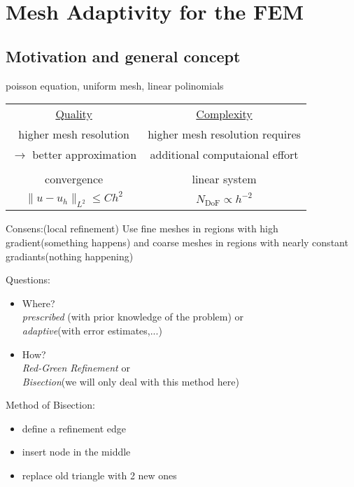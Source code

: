\section{Mesh Adaptivity for the FEM}
\subsection{Motivation and general concept}

\begin{example}
	poisson equation, uniform mesh, linear polinomials
\end{example}
\begin{center}
	\begin{tabular}{c | c}
		\underline{Quality} & \underline{Complexity}\\
		higher mesh resolution & higher mesh resolution requires \\
		$\to$ better approximation & additional computaional effort\\
		&  \\
		convergence & linear system \\
		$\|u-u_h\|_{L^2} \leq C h^2$ & $N_{\text{DoF}}\propto h^{-2}$
	\end{tabular}
\end{center}

Consens:(local refinement) Use fine meshes in regions with high gradient(something happens) and coarse meshes in regions with nearly constant gradiants(nothing happening)\vspace{1cm}

Questions:
\begin{itemize}
	\item Where?\\
		\textit{prescribed} (with prior knowledge of the problem) or \\
		\textit{adaptive}(with error estimates,...)
	\item How?\\
		\textit{Red-Green Refinement} or \\
		\textit{Bisection}(we will only deal with this method here)
\end{itemize}

Method of Bisection:
\begin{itemize}
	\item define a refinement edge
	\item insert node in the middle
	\item replace old triangle with 2 new ones 
\end{itemize}



